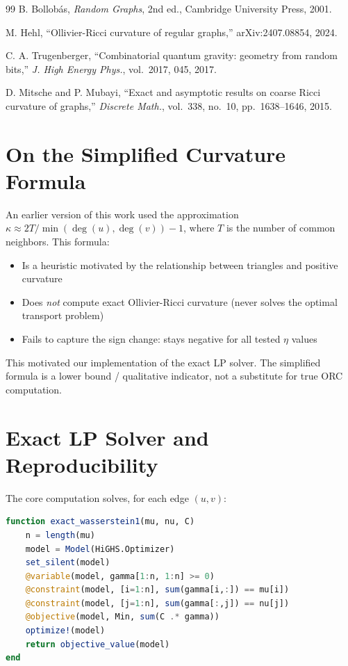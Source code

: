 \documentclass[12pt]{article}
\begin{document}
\begin{thebibliography}{99}
B. Bollob\'{a}s, \textit{Random Graphs}, 2nd ed., Cambridge University Press, 2001.

M. Hehl, ``Ollivier-Ricci curvature of regular graphs,''
arXiv:2407.08854, 2024.

C. A. Trugenberger, ``Combinatorial quantum gravity: geometry from random bits,''
\textit{J. High Energy Phys.}, vol.~2017, 045, 2017.

D. Mitsche and P. Mubayi, ``Exact and asymptotic results on coarse Ricci curvature of
graphs,'' \textit{Discrete Math.}, vol.~338, no.~10, pp.~1638--1646, 2015.

\end{thebibliography}

\appendix

\section{On the Simplified Curvature Formula}
\label{app:A}

An earlier version of this work used the approximation
$\kappa \approx 2T/\min(\deg(u), \deg(v)) - 1$, where $T$ is the number of common
neighbors. This formula:
\begin{itemize}
  \item Is a heuristic motivated by the relationship between triangles and positive curvature
  \item Does \emph{not} compute exact Ollivier-Ricci curvature (never solves the optimal
  transport problem)
  \item Fails to capture the sign change: stays negative for all tested $\eta$ values
\end{itemize}
This motivated our implementation of the exact LP solver. The simplified formula is a
lower bound / qualitative indicator, not a substitute for true ORC computation.

\section{Exact LP Solver and Reproducibility}
\label{app:B}

The core computation solves, for each edge $(u,v)$:

\begin{lstlisting}[language=Julia]
function exact_wasserstein1(mu, nu, C)
    n = length(mu)
    model = Model(HiGHS.Optimizer)
    set_silent(model)
    @variable(model, gamma[1:n, 1:n] >= 0)
    @constraint(model, [i=1:n], sum(gamma[i,:]) == mu[i])
    @constraint(model, [j=1:n], sum(gamma[:,j]) == nu[j])
    @objective(model, Min, sum(C .* gamma))
    optimize!(model)
    return objective_value(model)
end
\end{lstlisting}
\end{document}
